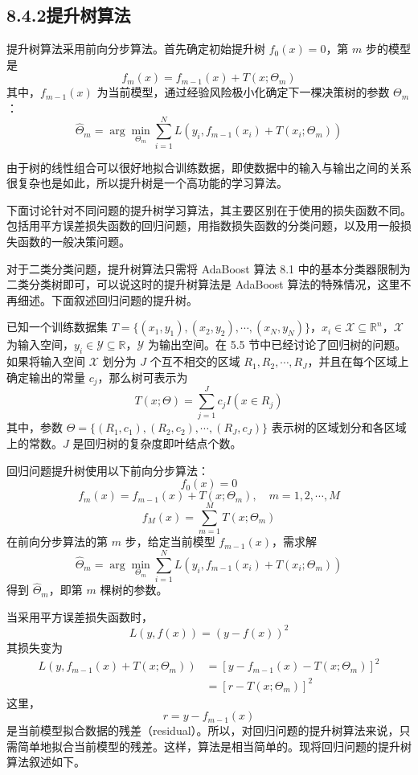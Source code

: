 \documentclass[UTF8,12pt,a4paper,fontset=fandol]{ctexart}
\begin{document}
\subsection*{8.4.2\quad 提升树算法}

提升树算法采用前向分步算法。首先确定初始提升树 $f_0(x)=0$，第 $m$ 步的模型是
\begin{equation}
f_m(x)=f_{m-1}(x)+T(x;\Theta_m)
\tag{8.25}
\end{equation}
其中，$f_{m-1}(x)$ 为当前模型，通过经验风险极小化确定下一棵决策树的参数 $\Theta_m$：
\begin{equation}
\hat{\Theta}_m=\arg\min_{\Theta_m}\sum_{i=1}^N
L(y_i,f_{m-1}(x_i)+T(x_i;\Theta_m))
\tag{8.26}
\end{equation}

由于树的线性组合可以很好地拟合训练数据，即使数据中的输入与输出之间的关系很复杂也是如此，所以提升树是一个高功能的学习算法。

下面讨论针对不同问题的提升树学习算法，其主要区别在于使用的损失函数不同。包括用平方误差损失函数的回归问题，用指数损失函数的分类问题，以及用一般损失函数的一般决策问题。

对于二类分类问题，提升树算法只需将 AdaBoost 算法 8.1 中的基本分类器限制为二类分类树即可，可以说这时的提升树算法是 AdaBoost 算法的特殊情况，这里不再细述。下面叙述回归问题的提升树。

已知一个训练数据集 $T=\{(x_1,y_1),(x_2,y_2),\cdots,(x_N,y_N)\}$，$x_i\in\mathcal{X}\subseteq\mathbb{R}^n$，$\mathcal{X}$ 为输入空间，$y_i\in\mathcal{Y}\subseteq\mathbb{R}$，$\mathcal{Y}$ 为输出空间。在 5.5 节中已经讨论了回归树的问题。如果将输入空间 $\mathcal{X}$ 划分为 $J$ 个互不相交的区域 $R_1,R_2,\cdots,R_J$，并且在每个区域上确定输出的常量 $c_j$，那么树可表示为
\begin{equation}
T(x;\Theta)=\sum_{j=1}^J c_jI(x\in R_j)
\tag{8.27}
\end{equation}
其中，参数 $\Theta=\{(R_1,c_1),(R_2,c_2),\cdots,(R_J,c_J)\}$ 表示树的区域划分和各区域上的常数。$J$ 是回归树的复杂度即叶结点个数。

回归问题提升树使用以下前向分步算法：
\[
f_0(x)=0
\]
\[
f_m(x)=f_{m-1}(x)+T(x;\Theta_m),\quad m=1,2,\cdots,M
\]
\[
f_M(x)=\sum_{m=1}^M T(x;\Theta_m)
\]
在前向分步算法的第 $m$ 步，给定当前模型 $f_{m-1}(x)$，需求解
\[
\hat{\Theta}_m=\arg\min_{\Theta_m}\sum_{i=1}^N
L(y_i,f_{m-1}(x_i)+T(x_i;\Theta_m))
\]
得到 $\hat{\Theta}_m$，即第 $m$ 棵树的参数。

当采用平方误差损失函数时，
\[
L(y,f(x))=(y-f(x))^2
\]
其损失变为
\[
\begin{aligned}
L(y,f_{m-1}(x)+T(x;\Theta_m))
&=[y-f_{m-1}(x)-T(x;\Theta_m)]^2\\
&=[r-T(x;\Theta_m)]^2
\end{aligned}
\]
这里，
\begin{equation}
r=y-f_{m-1}(x)
\tag{8.28}
\end{equation}
是当前模型拟合数据的残差（residual）。所以，对回归问题的提升树算法来说，只需简单地拟合当前模型的残差。这样，算法是相当简单的。现将回归问题的提升树算法叙述如下。
\end{document}
